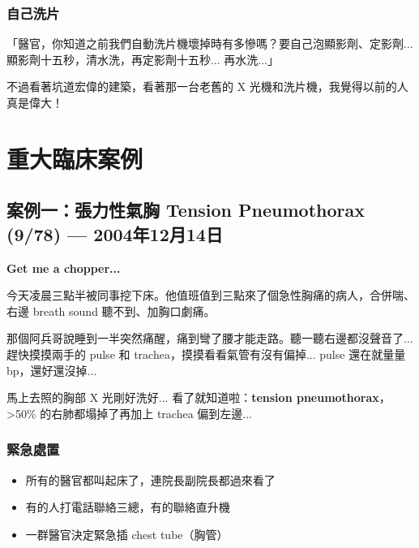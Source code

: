 \documentclass[12pt,a4paper]{article}
\newenvironment{myquote}{%
    \begin{tcolorbox}[
        colback=quote_bg,
        colframe=emergency_gray,
        boxrule=0pt,
        leftrule=3pt,
        arc=0pt,
        left=10pt,
        right=10pt,
        top=8pt,
        bottom=8pt
    ]
    \itshape
}{%
    \end{tcolorbox}
}
\begin{document}
\subsubsection{自己洗片}

\begin{myquote}
「醫官，你知道之前我們自動洗片機壞掉時有多慘嗎？要自己泡顯影劑、定影劑... 顯影劑十五秒，清水洗，再定影劑十五秒... 再水洗...」
\end{myquote}

不過看著坑道宏偉的建築，看著那一台老舊的 X 光機和洗片機，我覺得以前的人真是偉大！

\section{重大臨床案例}

\subsection{案例一：張力性氣胸 Tension Pneumothorax (9/78) — 2004年12月14日}

\textbf{\large\color{emergency_red} Get me a chopper...}

\vspace{0.3cm}

今天凌晨三點半被同事挖下床。他值班值到三點來了個急性胸痛的病人，合併喘、右邊 breath sound 聽不到、加胸口劇痛。

那個阿兵哥說睡到一半突然痛醒，痛到彎了腰才能走路。聽一聽右邊都沒聲音了... 趕快摸摸兩手的 pulse 和 trachea，摸摸看看氣管有沒有偏掉... pulse 還在就量量 bp，還好還沒掉...

馬上去照的胸部 X 光剛好洗好... 看了就知道啦：\textbf{tension pneumothorax}，>50\% 的右肺都塌掉了再加上 trachea 偏到左邊...

\subsubsection{緊急處置}

\begin{itemize}
    \item 所有的醫官都叫起床了，連院長副院長都過來看了
    \item 有的人打電話聯絡三總，有的聯絡直升機
    \item 一群醫官決定緊急插 chest tube（胸管）
\end{itemize}
\end{document}
